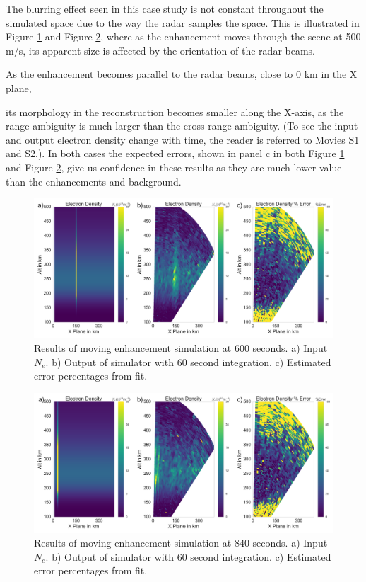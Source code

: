 \documentclass[draft,ras]{agutex}
\begin{document}
\begin{article}
The blurring effect seen in this case study is not constant throughout the simulated space due to the way the radar samples the space. This is illustrated in Figure \ref{fig:moving10mins} and Figure \ref{fig:moving14mins}, where as the enhancement moves through the scene at 500 m/s, its apparent size is affected by the orientation of the radar beams. 

As the enhancement becomes parallel to the radar beams, close to 0 km in the X plane,

its morphology in the reconstruction becomes smaller along the X-axis, as the range ambiguity is much larger than the cross range ambiguity. (To see the input and output electron density change with time, the reader is referred to Movies S1 and S2.). In both cases the expected errors, shown in panel c in both Figure \ref{fig:moving10mins} and Figure \ref{fig:moving14mins}, give us confidence in these results as they are much lower value than the enhancements and background.

\begin{figure}[!t]
\centering
\includegraphics[width=6in]{moving6mins}
\caption{Results of moving enhancement simulation at 600 seconds. a) Input $N_e$. b) Output of simulator with 60 second integration. c) Estimated error percentages from fit.}
\label{fig:moving10mins}
\end{figure}


\begin{figure}[!t]
\centering
\includegraphics[width=6in]{moving14mins}
\caption{Results of moving enhancement simulation at 840 seconds. a) Input $N_e$. b) Output of simulator with 60 second integration. c) Estimated error percentages from fit.}
\label{fig:moving14mins}
\end{figure}


\end{article}
\end{document}

